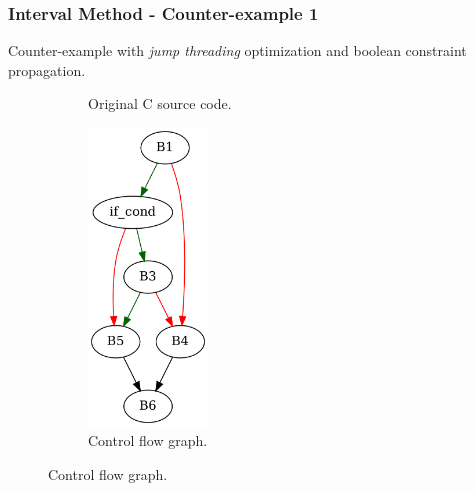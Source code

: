 
\clearpage

\subsubsection{Interval Method - Counter-example 1}

Counter-example with \textit{jump threading} optimization and boolean constraint propagation.

\begin{figure}[htbp]
	\centering
	\begin{subfigure}[b]{0.30\textwidth}
		\centering
		
		\caption{Original C source code.}
	\end{subfigure}
	\begin{subfigure}[b]{0.50\textwidth}
		\centering
		\includegraphics[width=0.35\textwidth]{inc/appendices/examples/interval/counter-example/bool_propagation_jump/f.png}
		\caption{Control flow graph.}
	\end{subfigure}
\end{figure}


